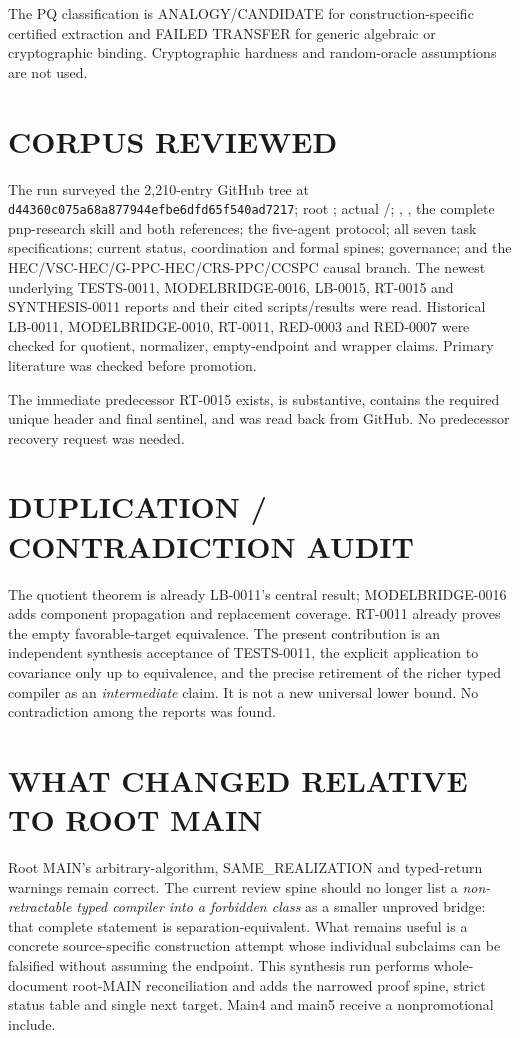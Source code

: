 \documentclass[11pt]{article}
\begin{document}
The PQ classification is ANALOGY/CANDIDATE for construction-specific
certified extraction and FAILED TRANSFER for generic algebraic or
cryptographic binding.  Cryptographic hardness and random-oracle assumptions
are not used.

\section{CORPUS REVIEWED}
The run surveyed the 2,210-entry GitHub tree at
\nolinkurl{d44360c075a68a877944efbe6dfd65f540ad7217}; root
; actual /;
, , the complete pnp-research skill and
both references; the five-agent protocol; all seven task specifications;
current status, coordination and formal spines; governance; and the
HEC/VSC-HEC/G-PPC-HEC/CRS-PPC/CCSPC causal branch.  The newest underlying
TESTS-0011, MODELBRIDGE-0016, LB-0015, RT-0015 and SYNTHESIS-0011 reports
and their cited scripts/results were read.  Historical LB-0011,
MODELBRIDGE-0010, RT-0011, RED-0003 and RED-0007 were checked for quotient,
normalizer, empty-endpoint and wrapper claims.  Primary literature was
checked before promotion.

The immediate predecessor RT-0015 exists, is substantive, contains the
required unique header and final sentinel, and was read back from GitHub.
No predecessor recovery request was needed.

\section{DUPLICATION / CONTRADICTION AUDIT}
The quotient theorem is already LB-0011's central result; MODELBRIDGE-0016
adds component propagation and replacement coverage.  RT-0011 already proves
the empty favorable-target equivalence.  The present contribution is an
independent synthesis acceptance of TESTS-0011, the explicit application to
covariance only up to equivalence, and the precise retirement of the richer
typed compiler as an \emph{intermediate} claim.  It is not a new universal
lower bound.  No contradiction among the reports was found.

\section{WHAT CHANGED RELATIVE TO ROOT MAIN}
Root MAIN's arbitrary-algorithm, SAME\_REALIZATION and typed-return warnings
remain correct.  The current review spine should no longer list a
\emph{non-retractable typed compiler into a forbidden class} as a smaller
unproved bridge: that complete statement is separation-equivalent.  What
remains useful is a concrete source-specific construction attempt whose
individual subclaims can be falsified without assuming the endpoint.  This
synthesis run performs whole-document root-MAIN reconciliation and adds the
narrowed proof spine, strict status table and single next target.  Main4 and
main5 receive a nonpromotional include.
\end{document}
